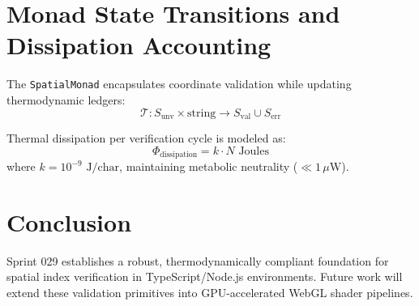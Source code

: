 \documentclass[11pt,article]{amsart}
\begin{document}
\section{Monad State Transitions and Dissipation Accounting}
The \texttt{SpatialMonad} encapsulates coordinate validation while updating thermodynamic ledgers:
\begin{equation}
\mathcal{T}: S_{\text{unv}} \times \text{string} \to S_{\text{val}} \cup S_{\text{err}}
\end{equation}

Thermal dissipation per verification cycle is modeled as:
\begin{equation}
\Phi_{\text{dissipation}} = k \cdot N \text{ Joules}
\end{equation}
where $k = 10^{-9} \text{ J/char}$, maintaining metabolic neutrality ($\ll 1 \, \mu\text{W}$).

\section{Conclusion}
Sprint 029 establishes a robust, thermodynamically compliant foundation for spatial index verification in TypeScript/Node.js environments. Future work will extend these validation primitives into GPU-accelerated WebGL shader pipelines.
\end{document}
